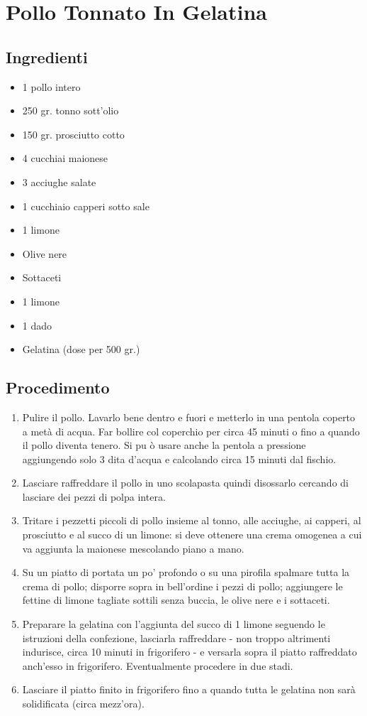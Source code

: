 \section{Pollo Tonnato In Gelatina}
\subsection{Ingredienti}
\begin{itemize}
\item 1 pollo intero   
\item 250 gr. tonno sott'olio  
\item 150 gr. prosciutto cotto  
\item 4 cucchiai maionese  
\item 3 acciughe salate   
\item 1 cucchiaio capperi sotto sale  
\item 1 limone  
\item Olive nere  
\item Sottaceti  
\item 1 limone  
\item 1 dado   
\item Gelatina (dose per 500 gr.)
\end{itemize}
\subsection{Procedimento}
\begin{enumerate}
\item  Pulire il pollo. Lavarlo bene dentro e fuori e metterlo in una pentola coperto a metà di acqua. Far bollire col coperchio per circa 45 minuti o fino a quando il pollo diventa tenero. Si pu ò usare anche la pentola a pressione aggiungendo solo 3 dita d'acqua e calcolando circa 15 minuti dal fischio.   
\item  Lasciare raffreddare il pollo in uno scolapasta quindi disossarlo cercando di lasciare dei pezzi di polpa intera.   
\item  Tritare i pezzetti piccoli di pollo insieme al tonno, alle acciughe, ai capperi, al prosciutto e al succo di un limone: si deve ottenere una crema omogenea a cui va aggiunta la maionese mescolando piano a mano.  
\item  Su un piatto di portata un po' profondo o su una pirofila spalmare tutta la crema di pollo; disporre sopra in bell'ordine i pezzi di pollo; aggiungere le fettine di limone tagliate sottili senza buccia, le olive nere e i sottaceti.  
\item  Preparare la gelatina con l'aggiunta del succo di 1 limone seguendo le istruzioni della confezione, lasciarla raffreddare - non troppo altrimenti indurisce, circa 10 minuti in frigorifero - e versarla sopra il piatto raffreddato anch'esso in frigorifero. Eventualmente procedere in due stadi.  
\item  Lasciare il piatto finito in frigorifero fino a quando tutta le gelatina non sarà solidificata (circa mezz'ora).
\end{enumerate}
